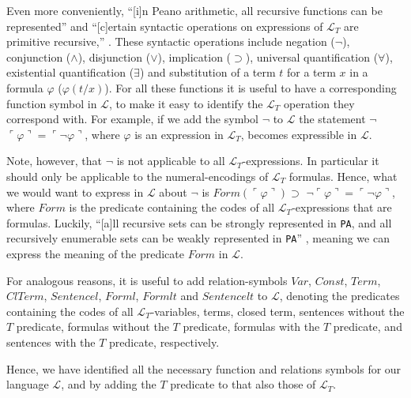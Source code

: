 Even more conveniently, ``[i]n Peano arithmetic, all recursive functions can be represented'' and ``[c]ertain syntactic operations on expressions of $\mathcal{L}_T$ are primitive recursive,'' \cite[p. 31--32]{halbach:2011}. These syntactic operations include negation ($\neg$), conjunction ($\wedge$), disjunction ($\vee$), implication ($\supset$), universal quantification ($\forall$), existential quantification ($\exists$) and substitution of a term $t$ for a term $x$ in a formula $\varphi$ ($\varphi(t/x)$). For all these functions it is useful to have a corresponding function symbol in $\mathcal{L}$, to make it easy to identify the $\mathcal{L}_T$ operation they correspond with. For example, if we add the symbol \d{$\neg$} to $\mathcal{L}$ the statement \d{$\neg$} $\ulcorner \varphi \urcorner = \ulcorner \neg \varphi \urcorner$, where $\varphi$ is an expression in $\mathcal{L}_T$, becomes expressible in $\mathcal{L}$.

Note, however, that \d{$\neg$} is not applicable to all $\mathcal{L}_T$-expressions. In particular it should only be applicable to the numeral-encodings of $\mathcal{L}_T$ formulas. Hence, what we would want to express in $\mathcal{L}$ about \d{$\neg$} is $Form(\ulcorner \varphi \urcorner) \supset$ \d{$\neg$}$\ulcorner \varphi \urcorner = \ulcorner \neg \varphi \urcorner$, where $Form$ is the predicate containing the codes of all $\mathcal{L}_T$-expressions that are formulas. Luckily, ``[a]ll recursive sets can be strongly represented in \texttt{PA}, and all recursively enumerable sets can be weakly represented in \texttt{PA}'' \cite[p. 31]{halbach:2011}, meaning we can express the meaning of the predicate $Form$ in $\mathcal{L}$.

For analogous reasons, it is useful to add relation-symbols $Var$, $Const$, $Term$, $ClTerm$, $Sentencel$, $Forml$, $Formlt$ and $Sentencelt$ to $\mathcal{L}$, denoting the predicates containing the codes of all $\mathcal{L}_T$-variables, terms, closed term, sentences without the $T$ predicate, formulas
without the $T$ predicate, formulas with the $T$ predicate, and sentences with the $T$ predicate, respectively.

Hence, we have identified all the necessary function and relations symbols for our language $\mathcal{L}$, and by adding the $T$ predicate to that also those of $\mathcal{L}_T$. 

